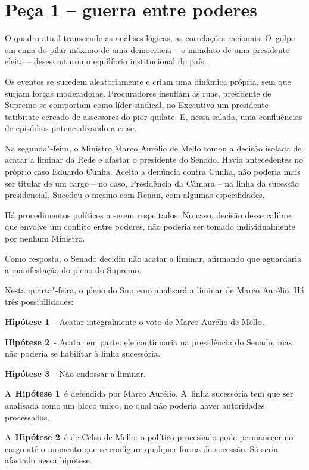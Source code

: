  

\section{Peça 1 -- guerra entre poderes}

O quadro atual transcende as análises lógicas, as correlações racionais.
O~golpe em cima do pilar máximo de uma democracia -- o mandato de uma
presidente eleita -- desestruturou o equilíbrio institucional do país.

Os eventos se sucedem aleatoriamente e criam uma dinâmica própria, sem
que surjam forças moderadoras. Procuradores insuflam as ruas, presidente
de Supremo se comportam como líder sindical, no Executivo um presidente
tatibitate cercado de assessores do pior quilate. E, nessa salada, uma
confluências de episódios potencializando a crise.

Na segunda"-feira, o Ministro Marco Aurélio de Mello tomou a decisão
isolada de acatar a liminar da Rede e afastar o presidente do Senado.
Havia antecedentes no próprio caso Eduardo Cunha. Aceita a denúncia
contra Cunha, não poderia mais ser titular de um cargo -- no caso,
Presidência da Câmara -- na linha da sucessão presidencial. Sucedeu o
mesmo com Renan, com algumas especifidades.

Há procedimentos políticos a serem respeitados. No caso, decisão desse
calibre, que envolve um conflito entre poderes, não poderia ser tomado
individualmente por nenhum Ministro.

Como resposta, o Senado decidiu não acatar a liminar, afirmando que
aguardaria a manifestação do pleno do Supremo.

Nesta quarta"-feira, o pleno do Supremo analisará a liminar de Marco
Aurélio. Há três possibilidades:

\textbf{Hipótese 1}~- Acatar integralmente o voto de Marco Aurélio de
Mello.

\textbf{Hipótese 2}~- Acatar em parte: ele continuaria na presidência do
Senado, mas não poderia se habilitar à linha sucessória.

\textbf{Hipótese 3}~- Não endossar a liminar.

A~\textbf{Hipótese 1}~é defendida por Marco Aurélio. A~linha sucessória
tem que ser analisada como um bloco único, no qual não poderia haver
autoridades processadas.

A~\textbf{Hipótese 2}~é de Celso de Mello: o político processado pode
permanecer no cargo até o momento que se configure qualquer forma de
sucessão. Só seria afastado nessa hipótese.

